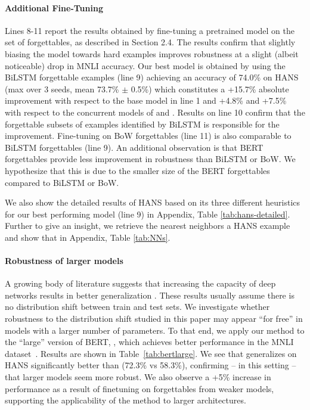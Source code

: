 \paragraph{Additional Fine-Tuning} Lines 8-11 report the results obtained by fine-tuning a pretrained model on the set of forgettables, as described in Section 2.4. The results confirm that slightly biasing the model towards hard examples improves robustness at a slight (albeit noticeable) drop in MNLI accuracy. 
Our best model is obtained by using the BiLSTM forgettable examples (line 9) achieving an accuracy of 74.0\% on HANS (max over 3 seeds, mean 73.7\% $\pm$ 0.5\%)
which constitutes a +15.7\% absolute improvement with respect to the base model in line 1 and +4.8\% and +7.5\% with respect to the concurrent models of  and . 
Results on line 10 confirm that the forgettable subsets of examples identified by BiLSTM is responsible for the improvement. 
Fine-tuning on BoW forgettables (line 11) is also comparable to BiLSTM forgettables (line 9).
An additional observation is that BERT forgettables provide less improvement in robustness than BiLSTM or BoW. 
We hypothesize that this is due to the smaller size of the BERT forgettables compared to BiLSTM or BoW.

We also show the detailed results of HANS based on its three different heuristics for our best performing model (line 9) in Appendix, Table \ref{tab:hans-detailed}. 
Further to give an insight, we retrieve the nearest neighbors 
a HANS example and show that in Appendix, Table \ref{tab:NNs}. 




\paragraph{Robustness of larger models} 
A growing body of literature suggests that increasing the capacity of deep networks results in better generalization \cite{belkin2018reconciling}. These results usually assume there is no distribution shift between train and test sets. We investigate whether robustness to the distribution shift studied in this paper may appear ``for free'' in models with a larger number of parameters. To that end, we apply our method to the ``large'' version of BERT, \bertlarge, which 
achieves better performance in the MNLI dataset~\cite{devlin2018bert}. Results are shown in Table~\ref{tab:bertlarge}. We see that \bertlarge generalizes on HANS significantly better than \bertbase (72.3\% vs 58.3\%), confirming -- in this setting -- that larger models seem more robust. We also observe a +5\% increase in performance as a result of finetuning on forgettables from weaker models, supporting the applicability of the method to larger architectures.


